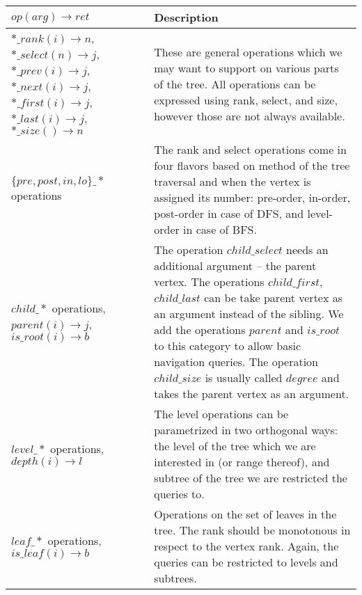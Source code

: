 \noindent\begin{tabularx}{\textwidth}{|L{0.7}|L{1.3}|}
	\hline
	$op(arg) \rightarrow ret$
	& Description \\ \hline \hline
	
	$*\_rank(i) \rightarrow n$, \newline
	$*\_select(n) \rightarrow j$, \newline
	$*\_prev(i) \rightarrow j$, \newline
	$*\_next(i) \rightarrow j$, \newline
	$*\_first(i) \rightarrow j$, \newline
	$*\_last(i) \rightarrow j$, \newline
	$*\_size() \rightarrow n$
	& These are general operations which we may want to support on various parts of the tree.
	All operations can be expressed using rank, select, and size, however those are not always available. \\ \hline \hline
	
	$\{pre,post,in,lo\}\_*$ operations
	& The rank and select operations come in four flavors based on method of the tree traversal and when the vertex is assigned its number:
	pre-order, in-order, post-order in case of DFS, and level-order in case of BFS. \\ \hline
	
	$child\_*$ operations, \newline
	$parent(i) \rightarrow j$, \newline
	$is\_root(i) \rightarrow b$
	& The operation $child\_select$ needs an additional argument -- the parent vertex.
	The operations $child\_first$, $child\_last$ can be take parent vertex as an argument instead of the sibling.
	We add the operations $parent$ and $is\_root$ to this category to allow basic navigation queries.
	The operation $child\_size$ is usually called $degree$ and takes the parent vertex as an argument.\\ \hline

	$level\_*$ operations, \newline
	$depth(i) \rightarrow l$
	& The level operations can be parametrized in two orthogonal ways:
	the level of the tree which we are interested in (or range thereof), and subtree of the tree we are restricted the queries to. \\ \hline
	
	$leaf\_*$ operations, \newline
	$is\_leaf(i) \rightarrow b$
	& Operations on the set of leaves in the tree.
	The rank should be monotonous in respect to the vertex rank. 
	Again, the queries can be restricted to levels and subtrees.\\ \hline \hline
	

\end{tabularx}
